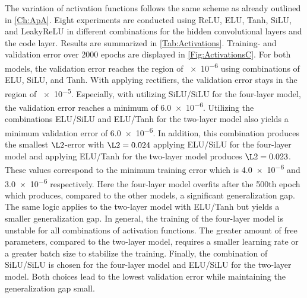 The variation of activation functions follows the same scheme as already outlined in \cref{Ch:ApA}. Eight experiments are conducted using ReLU, ELU, Tanh, SiLU, and LeakyReLU in different combinations for the hidden convolutional layers and the code layer. Results are summarized in \cref{Tab:Activations}. Training- and validation error over 2000 epochs are displayed in \cref{Fig:ActivationsC}. For both models, the validation error reaches the region of \num{e-6} using combinations of ELU, SiLU, and Tanh. With applying rectifiers, the validation error stays in the region of \num{e-5}. Especially, with utilizing SiLU/SiLU for the four-layer model, the validation error reaches a minimum of \num{6.0e-6}. Utilizing the combinations ELU/SiLU and ELU/Tanh for the two-layer model also yields a minimum validation error of \num{6.0e-6}. In addition, this combination produces the smallest \(\L2\)-error with \(\L2=0.024\) applying ELU/SiLU for the four-layer model and applying ELU/Tanh for the two-layer model produces \(\L2=0.023\). These values correspond to the minimum training error which is \num{4.0e-6} and \num{3.0e-6} respectively. Here the four-layer model overfits after the 500th epoch which produces, compared to the other models, a significant generalization gap. The same logic applies to the two-layer model with ELU/Tanh but yields a smaller generalization gap. In general, the training of the four-layer model is unstable for all combinations of activation functions. The greater amount of free parameters, compared to the two-layer model, requires a smaller learning rate or a greater batch size to stabilize the training. Finally, the combination of SiLU/SiLU is chosen for the four-layer model and ELU/SiLU for the two-layer model. Both choices lead to the lowest validation error while maintaining the generalization gap small.\\
